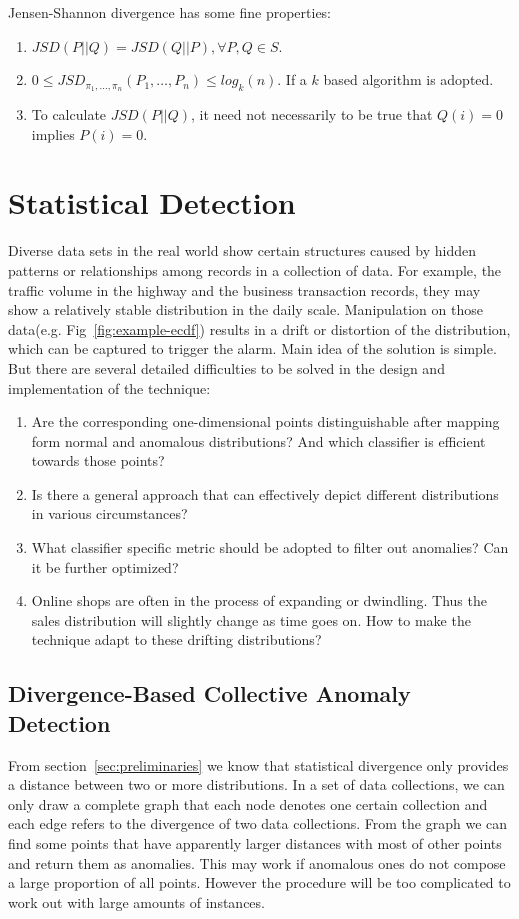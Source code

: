 \documentclass[a4paper]{IEEEtran}
\begin{document}
		Jensen-Shannon divergence has some fine properties:
		\begin{enumerate}
			\item $JSD(P||Q) = JSD(Q||P), \forall P, Q\in S$.
			\item $0 \le JSD_{\pi_1, \dots, \pi_n}(P_1, \dots, P_n) \le log_k(n)$. If a $k$ based algorithm is adopted.
			\item To calculate $JSD(P||Q)$, it need not necessarily to be true that $Q(i)=0$ implies $P(i)=0$.
		\end{enumerate}
	
	\section{Statistical Detection}\label{sec:algorithm-details}
		Diverse data sets in the real world show certain structures caused by hidden patterns or relationships among records in a collection of data. For example, the traffic volume in the highway and the business transaction records, they may show a relatively stable distribution in the daily scale. Manipulation on those data(e.g. Fig~\ref{fig:example-ecdf}) results in a drift or distortion of the distribution, which can be captured to trigger the alarm. Main idea of the solution is simple. But there are several detailed difficulties to be solved in the design and implementation of the technique:
		
		\begin{enumerate}
			\item Are the corresponding one-dimensional points distinguishable after mapping form normal and anomalous distributions? And which classifier is efficient towards those points?
			\item Is there a general approach that can effectively depict different distributions in various circumstances?
			\item What classifier specific metric should be adopted to filter out anomalies? Can it be further optimized?
			\item Online shops are often in the process of expanding or dwindling. Thus the sales distribution will slightly change as time goes on. How to make the technique adapt to these drifting distributions?
		\end{enumerate}
			
		\subsection{Divergence-Based Collective Anomaly Detection}
			From section~\ref{sec:preliminaries} we know that statistical divergence only provides a distance between two or more distributions. In a set of data collections, we can only draw a complete graph that each node denotes one certain collection and each edge refers to the divergence of two data collections. From the graph we can find some points that have apparently larger distances with most of other points and return them as anomalies. This may work if anomalous ones do not compose a large proportion of all points. However the procedure will be too complicated to work out with large amounts of instances. 
			
\end{document}
